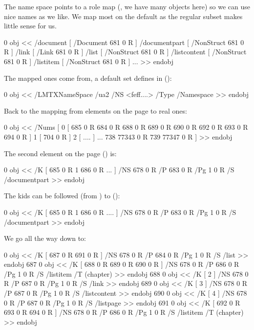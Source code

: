 The name space points to a role map (, we have many objects here)
so we can use nice names as we like. We map most on the default 
as the regular subset makes little sense for us.

 0 obj
    <<
        /document     [ /Document  681 0 R ]
        /documentpart [ /NonStruct 681 0 R ]
        /link         [ /Link      681 0 R ]
        /list         [ /NonStruct 681 0 R ]
        /listcontent  [ /NonStruct 681 0 R ]
        /listitem     [ /NonStruct 681 0 R ]
        ...
    >>
endobj
\stoptyping

\page

The mapped ones come from, a default set defines in ():

 0 obj
    <<
        /LMTXNameSpace /ua2
        /NS            <feff....>
        /Type          /Namespace
    >>
endobj
\stoptyping

Back to the mapping from elements on the page to real ones:

 0 obj
<<
    /Nums [
          0 [ 685 0 R 684 0 R 688 0 R 689 0 R 690 0 R 692 0 R 693 0 R 694 0 R ]
          1 [ 704 0 R ]
          2 [ .... ]
        ...
        738 77343 0 R
        739 77347 0 R
    ]
>>
endobj
\stoptyping

\page

The second element on the page () is:

 0 obj
<<
    /K [ 685 0 R 1 686 0 R ... ]
    /NS 678 0 R
    /P 683 0 R
    /Pg 1 0 R
    /S /documentpart
>>
endobj
\stoptyping

The kids can be followed (from ) to ():

 0 obj
<<
    /K [ 685 0 R 1 686 0 R .... ]
    /NS 678 0 R
    /P 683 0 R
    /Pg 1 0 R
    /S /documentpart
>>
endobj
\stoptyping

\page

We go all the way down to:

 0 obj
<< /K [ 687 0 R 691 0 R ] /NS 678 0 R /P 684 0 R /Pg 1 0 R /S /list >>
endobj
687 0 obj
<< /K [ 688 0 R 689 0 R 690 0 R ] /NS 678 0 R /P 686 0 R /Pg 1 0 R /S /listitem /T (chapter) >>
endobj
688 0 obj
<< /K [ 2 ] /NS 678 0 R /P 687 0 R /Pg 1 0 R /S /link >>
endobj
689 0 obj
<< /K [ 3 ] /NS 678 0 R /P 687 0 R /Pg 1 0 R /S /listcontent >>
endobj
690 0 obj
<< /K [ 4 ] /NS 678 0 R /P 687 0 R /Pg 1 0 R /S /listpage >>
endobj
691 0 obj
<< /K [ 692 0 R 693 0 R 694 0 R ] /NS 678 0 R /P 686 0 R /Pg 1 0 R /S /listitem /T (chapter) >>
endobj
\stoptyping

